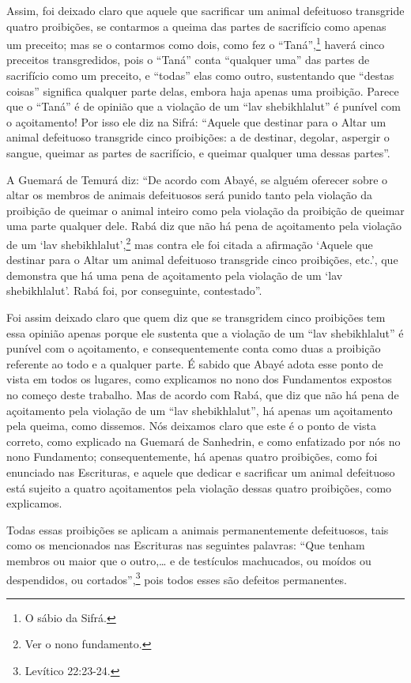 Assim, foi deixado claro que aquele que sacrificar um animal defeituoso
transgride quatro proibições, se contarmos a queima das partes de
sacrifício como apenas um preceito; mas se o contarmos como dois, como
fez o ``Taná'',\footnote{O sábio da Sifrá.} haverá cinco preceitos
transgredidos, pois o ``Taná'' conta ``qualquer uma'' das partes de
sacrifício como um preceito, e ``todas'' elas como outro, sustentando
que ``destas coisas'' significa qualquer parte delas, embora haja
apenas uma proibição. Parece que o ``Taná'' é de opinião que a violação
de um ``lav shebikhlalut'' é punível com o açoitamento! Por isso ele diz na
Sifrá: ``Aquele que destinar para o Altar um animal defeituoso
transgride cinco proibições: a de destinar, degolar, aspergir o sangue,
queimar as partes de sacrifício, e queimar qualquer uma dessas
partes''.

A Guemará de Temurá diz: ``De acordo com Abayé, se alguém oferecer
sobre o altar os membros de animais defeituosos será punido tanto pela
violação da proibição de queimar o animal inteiro como pela violação da
proibição de queimar uma parte qualquer dele. Rabá diz que não há pena
de açoitamento pela violação de um `lav
shebikhlalut',\footnote{Ver o nono fundamento.} mas contra ele foi citada a
afirmação `Aquele que destinar para o Altar um animal defeituoso
transgride cinco proibições, etc.', que demonstra que há uma pena de
açoitamento pela violação de um `lav shebikhlalut'. Rabá foi, por
conseguinte, contestado''.

Foi assim deixado claro que quem diz que se transgridem cinco proibições
tem essa opinião apenas porque ele sustenta que a violação de um ``lav
shebikhlalut'' é punível com o açoitamento, e consequentemente conta
como duas a proibição referente ao todo e a qualquer parte. É sabido que
Abayé adota esse ponto de vista em todos os lugares, como explicamos no
nono dos Fundamentos expostos no começo deste trabalho. Mas de acordo
com Rabá, que diz que não há pena de açoitamento pela violação de um
``lav shebikhlalut'', há apenas um açoitamento pela queima, como
dissemos. Nós deixamos claro que este é o ponto de vista correto, como
explicado na Guemará de Sanhedrin, e como enfatizado por nós no nono
Fundamento; consequentemente, há apenas quatro proibições, como foi
enunciado nas Escrituras, e aquele que dedicar e sacrificar um animal
defeituoso está sujeito a quatro açoitamentos pela violação dessas
quatro proibições, como explicamos.

Todas essas proibições se aplicam a animais permanentemente defeituosos,
tais como os mencionados nas Escrituras nas seguintes palavras: ``Que
tenham membros ou maior que o outro,\ldots{} e de testículos machucados, ou
moídos ou despendidos, ou cortados'',\footnote{Levítico 22:23-24.} pois todos
esses são defeitos permanentes.

